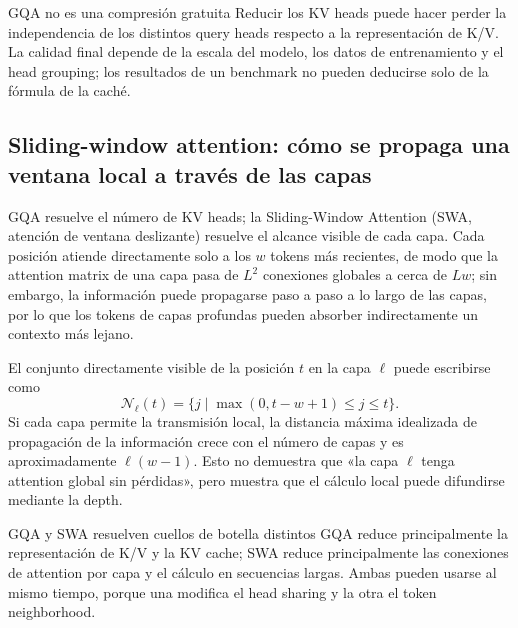 \begin{warningbox}{GQA no es una compresión gratuita}
Reducir los KV heads puede hacer perder la independencia de los distintos query heads respecto a la representación de K/V. La calidad final depende de la escala del modelo, los datos de entrenamiento y el head grouping; los resultados de un benchmark no pueden deducirse solo de la fórmula de la caché.
\end{warningbox}


\subsection{Sliding-window attention: cómo se propaga una ventana local a través de las capas}

GQA resuelve el número de KV heads; la Sliding-Window Attention (SWA, atención de ventana deslizante) resuelve el alcance visible de cada capa. Cada posición atiende directamente solo a los $w$ tokens más recientes, de modo que la attention matrix de una capa pasa de $L^2$ conexiones globales a cerca de $Lw$; sin embargo, la información puede propagarse paso a paso a lo largo de las capas, por lo que los tokens de capas profundas pueden absorber indirectamente un contexto más lejano.

El conjunto directamente visible de la posición $t$ en la capa $\ell$ puede escribirse como
\[
\mathcal{N}_{\ell}(t)=\{j\mid \max(0,t-w+1)\le j\le t\}.
\]
Si cada capa permite la transmisión local, la distancia máxima idealizada de propagación de la información crece con el número de capas y es aproximadamente $\ell(w-1)$. Esto no demuestra que «la capa $\ell$ tenga attention global sin pérdidas», pero muestra que el cálculo local puede difundirse mediante la depth.

\begin{importantbox}{GQA y SWA resuelven cuellos de botella distintos}
GQA reduce principalmente la representación de K/V y la KV cache; SWA reduce principalmente las conexiones de attention por capa y el cálculo en secuencias largas. Ambas pueden usarse al mismo tiempo, porque una modifica el head sharing y la otra el token neighborhood.
\end{importantbox}

